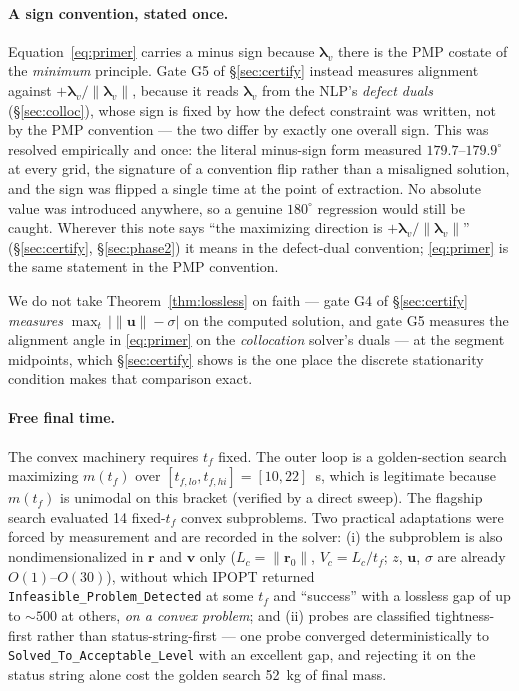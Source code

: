 \documentclass[11pt]{article}
\newcommand{\rvec}{\mathbf{r}}
\newcommand{\vvec}{\mathbf{v}}
\newcommand{\uvec}{\mathbf{u}}
\newcommand{\lamv}{\boldsymbol{\lambda}_v}
\begin{document}
\paragraph{A sign convention, stated once.}
Equation~\eqref{eq:primer} carries a minus sign because $\lamv$ there is
the PMP costate of the \emph{minimum} principle. Gate G5 of
\S\ref{sec:certify} instead measures alignment against
$+\lamv/\lVert\lamv\rVert$, because it reads $\lamv$ from the NLP's
\emph{defect duals} (\S\ref{sec:colloc}), whose sign is fixed by how the
defect constraint was written, not by the PMP convention --- the two differ
by exactly one overall sign. This was resolved empirically and once: the
literal minus-sign form measured $179.7$--$179.9^\circ$ at every grid, the
signature of a convention flip rather than a misaligned solution, and the
sign was flipped a single time at the point of extraction. No absolute
value was introduced anywhere, so a genuine $180^\circ$ regression would
still be caught. Wherever this note says ``the maximizing direction is
$+\lamv/\lVert\lamv\rVert$'' (\S\ref{sec:certify}, \S\ref{sec:phase2}) it
means in the defect-dual convention; \eqref{eq:primer} is the same
statement in the PMP convention.

We do not
take Theorem~\ref{thm:lossless} on faith --- gate G4 of
\S\ref{sec:certify} \emph{measures} $\max_t\, \big|\lVert\uvec\rVert -
\sigma\big|$ on the computed solution, and gate G5 measures the alignment
angle in \eqref{eq:primer} on the \emph{collocation} solver's duals --- at
the segment midpoints, which \S\ref{sec:certify} shows is the one place the
discrete stationarity condition makes that comparison exact.

\paragraph{Free final time.}
The convex machinery requires $t_f$ fixed. The outer loop is a
golden-section search maximizing $m(t_f)$ over $[t_{f,lo}, t_{f,hi}] =
[10,22]$~s, which is legitimate because $m(t_f)$ is unimodal on this
bracket (verified by a direct sweep). The flagship search evaluated 14
fixed-$t_f$ convex subproblems. Two practical adaptations were forced by
measurement and are recorded in the solver: (i) the subproblem is also
nondimensionalized in $\rvec$ and $\vvec$ only ($L_c = \lVert\rvec_0\rVert$,
$V_c = L_c/t_f$; $z$, $\uvec$, $\sigma$ are already $O(1)$--$O(30)$),
without which IPOPT returned \texttt{Infeasible\_Problem\_Detected} at some
$t_f$ and ``success'' with a lossless gap of up to $\sim 500$ at others,
\emph{on a convex problem}; and (ii) probes are classified
tightness-first rather than status-string-first --- one probe converged
deterministically to \texttt{Solved\_To\_Acceptable\_Level} with an
excellent gap, and rejecting it on the status string alone cost the golden
search 52~kg of final mass.
\end{document}
